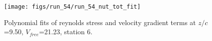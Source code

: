 \begin{figure}[H]
\centering
\texttt{[image: figs/run\_54/run\_54\_nut\_tot\_fit]}
\caption{Polynomial fits of reynolds stress and velocity gradient terms at $z/c$=9.50, $V_{free}$=21.23, station 6.}
\label{fig:run_54_nut_tot_fit}
\end{figure}


